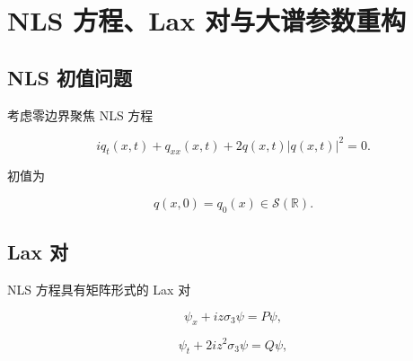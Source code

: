 \documentclass[
    lang=cn,
    scheme=chinese,
    mode=simple,
    device=normal,
    color=blue,
    math=cm,
    thmcnt=section,
    12pt
]{elegantbook}
\begin{document}
\section{NLS 方程、Lax 对与大谱参数重构}

\subsection{NLS 初值问题}

考虑零边界聚焦 NLS 方程

\begin{equation}
    iq_t(x,t)+q_{xx}(x,t)+2q(x,t)\lvert q(x,t)\rvert^2=0.
    \tag{5.1.1}
    \label{eq:5.1.1}
\end{equation}

初值为

\begin{equation}
    q(x,0)=q_0(x)\in\mathcal S(\mathbb{R}).
    \tag{5.1.2}
    \label{eq:5.1.2}
\end{equation}




\subsection{Lax 对}

NLS 方程具有矩阵形式的 Lax 对

\begin{equation}
    \psi_x+iz\sigma_3\psi=P\psi,
    \tag{5.1.3}
    \label{eq:5.1.3}
\end{equation}

\begin{equation}
    \psi_t+2iz^2\sigma_3\psi=Q\psi,
    \tag{5.1.4}
    \label{eq:5.1.4}
\end{equation}
\end{document}
